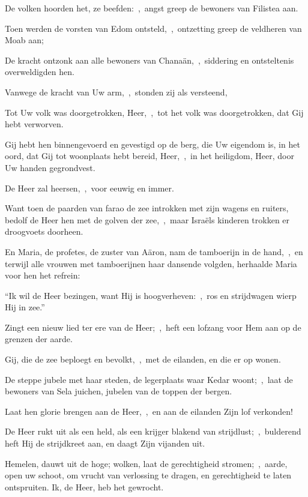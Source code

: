 \documentclass[12pt,twoside,a5paper]{article}
\begin{document}
\begin{halfparskip}

  De volken hoorden het, ze beefden:~\sep\ angst greep de bewoners van Filistea aan.

  Toen werden de vorsten van Edom ontsteld,~\sep\ ontzetting greep de veldheren van Moab aan;

  De kracht ontzonk aan alle bewoners van Chanaän,~\sep\ siddering en ontsteltenis overweldigden hen.

  Vanwege de kracht van Uw arm,~\sep\ stonden zij als versteend,

  Tot Uw volk was doorgetrokken, Heer,~\sep\ tot het volk was doorgetrokken, dat Gij hebt verworven.

  Gij hebt hen binnengevoerd en gevestigd op de berg, die Uw eigendom is, in het oord, dat Gij tot woonplaats hebt bereid, Heer,~\sep\ in het heiligdom, Heer, door Uw handen gegrondvest.

  De Heer zal heersen,~\sep\ voor eeuwig en immer.

  Want toen de paarden van farao de zee introkken met zijn wagens en ruiters, bedolf de Heer hen met de golven der zee,~\sep\ maar Israëls kinderen trokken er droogvoets doorheen.

  En Maria, de profetes, de zuster van Aäron, nam de tamboerijn in de hand,~\sep\ en terwijl alle vrouwen met tamboerijnen haar dansende volgden, herhaalde Maria voor hen het refrein:

  ``Ik wil de Heer bezingen, want Hij is hoogverheven:~\sep\ ros en strijdwagen wierp Hij in zee.''
\end{halfparskip}

\begin{halfparskip}
   Zingt een nieuw lied ter ere van de Heer;~\sep\ heft een lofzang voor Hem aan op de grenzen der aarde.

  Gij, die de zee beploegt en bevolkt,~\sep\ met de eilanden, en die er op wonen.

  De steppe jubele met haar steden, de legerplaats waar Kedar woont;~\sep\ laat de bewoners van Sela juichen, jubelen van de toppen der bergen.

  Laat hen glorie brengen aan de Heer,~\sep\ en aan de eilanden Zijn lof verkonden!

  De Heer rukt uit als een held, als een krijger blakend van strijdlust;~\sep\ bulderend heft Hij de strijdkreet aan, en daagt Zijn vijanden uit.

  Hemelen, dauwt uit de hoge; wolken, laat de gerechtigheid stromen;~\sep\ aarde, open uw schoot, om vrucht van verlossing te dragen, en gerechtigheid te laten ontspruiten. Ik, de Heer, heb het gewrocht.
\end{halfparskip}
\end{document}
